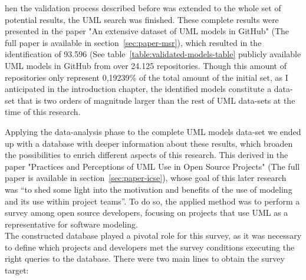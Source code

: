 \documentclass[a4paper, 12pt]{book}
\begin{document}
hen the validation process described before was extended to the whole set of potential results, the UML search was finished.
These complete results were presented in the paper "An extensive dataset of UML models in GitHub" (The full paper is available in section~\ref{sec:paper-msr}),
which resulted in the identification of 93.596 (See table~\ref{table:validated-models-table} publicly available UML models
in GitHub from over 24.125 repositories. Though this amount of repositories only represent 0,19239\% of the total amount of the initial set,
as I anticipated in the introduction chapter, the identified models constitute a data-set that is two orders of magnitude larger than the
rest of UML data-sets at the time of this research.\par
Applying the data-analysis phase to the complete UML models data-set we ended up with a database with deeper information about these results,
which broaden the possibilities to enrich different aspects of this research. This derived in the paper "Practices and Perceptions of UML Use
in Open Source Projects" (The full paper is available in section~\ref{sec:paper-icse}), whose goal of this later research was ``to shed some
light into the motivation and benefits of the use of modeling and its use within project teams''. To do so, the applied method was to
perform a survey among open source developers, focusing on projects that use UML as a representative for software modeling.\\
The constructed database played a pivotal role for this survey, as it was necessary to define which projects and developers met the
survey conditions executing the right queries to the database. There were two main lines to obtain the survey target:
\end{document}
